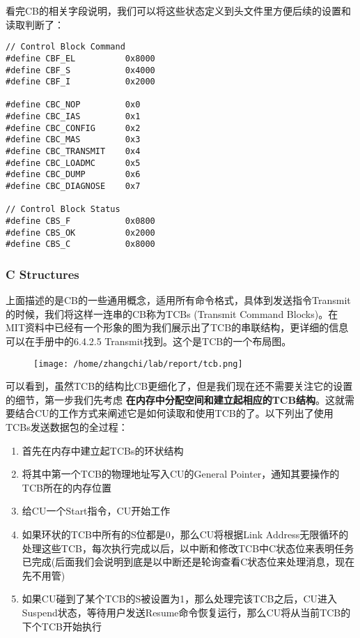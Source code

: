 \documentclass{article}
\newcommand{\highlight}[1]{{\bfseries \color{red}  #1}}
\begin{document}
\begin{CJK*}{UTF8}{gkai}
看完CB的相关字段说明，我们可以将这些状态定义到头文件里方便后续的设置和读取判断了：

\begin{lstlisting}[style=ccode, title={\scriptsize \ttfamily \bfseries kern/e100.h}]
// Control Block Command
#define CBF_EL          0x8000
#define CBF_S           0x4000
#define CBF_I           0x2000

#define CBC_NOP         0x0
#define CBC_IAS         0x1
#define CBC_CONFIG      0x2
#define CBC_MAS         0x3
#define CBC_TRANSMIT    0x4
#define CBC_LOADMC      0x5
#define CBC_DUMP        0x6
#define CBC_DIAGNOSE    0x7

// Control Block Status
#define CBS_F           0x0800
#define CBS_OK          0x2000
#define CBS_C           0x8000
\end{lstlisting}

\subsubsection{C Structures}


上面描述的是CB的一些通用概念，适用所有命令格式，具体到发送指令Transmit的时候，我们将这样一连串的CB称为TCBs (Transmit Command Blocks)。在MIT资料中已经有一个形象的图为我们展示出了TCB的串联结构，更详细的信息可以在手册中的6.4.2.5 Transmit找到。这个是TCB的一个布局图。

\begin{figure}[htp]
\centering
\texttt{[image: /home/zhangchi/lab/report/tcb.png]}
\end{figure}

可以看到，虽然TCB的结构比CB更细化了，但是我们现在还不需要关注它的设置的细节，第一步我们先考虑\highlight{在内存中分配空间和建立起相应的TCB结构}。这就需要结合CU的工作方式来阐述它是如何读取和使用TCB的了。以下列出了使用TCBs发送数据包的全过程：

\label{tcbproc}

\begin{enumerate}
\item{首先在内存中建立起TCBs的环状结构}
\item{将其中第一个TCB的物理地址写入CU的General Pointer，通知其要操作的TCB所在的内存位置}
\item{给CU一个Start指令，CU开始工作}
\item{如果环状的TCB中所有的S位都是0，那么CU将根据Link Address无限循环的处理这些TCB，每次执行完成以后，以中断和修改TCB中C状态位来表明任务已完成(后面我们会说明到底是以中断还是轮询查看C状态位来处理消息，现在先不用管)}
\item{如果CU碰到了某个TCB的S被设置为1，那么处理完该TCB之后，CU进入Suspend状态，等待用户发送Resume命令恢复运行，那么CU将从当前TCB的下个TCB开始执行}
\end{enumerate}



\end{CJK*}
\end{document}
